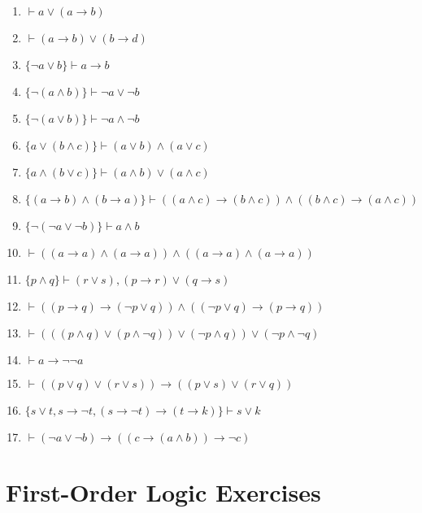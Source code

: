 \begin{enumerate}
    \item \(\vdash a \lor (a \to b)\)
    \item \(\vdash (a \to b) \lor (b \to d)\)
    \item \(\{\lnot a \lor b\} \vdash a \to b\)
    \item \(\{\lnot(a \land b)\} \vdash \lnot a \lor \lnot b\)
    \item \(\{\lnot(a \lor b)\} \vdash \lnot a \land \lnot b\)
    \item \(\{a \lor (b \land c)\} \vdash (a \lor b) \land (a \lor c)\)
    \item \(\{a \land (b \lor c)\} \vdash (a \land b) \lor (a \land c)\)
    \item \(\{(a \to b) \land (b \to a)\} \vdash ((a \land c) \to (b \land c)) \land ((b \land c) \to (a \land c))\)
    \item \(\{\lnot(\lnot a \lor \lnot b)\} \vdash a \land b\)
    \item \(\vdash ((a \to a) \land (a \to a)) \land ((a \to a) \land (a \to a))\)
    \item \(\{p \land q\} \vdash (r \lor s), (p \to r) \lor (q \to s)\)
    \item \(\vdash ((p \to q) \to (\lnot p \lor q)) \land ((\lnot p \lor q) \to (p \to q))\)
    \item \(\vdash (((p \land q) \lor (p \land \lnot q)) \lor (\lnot p \land q)) \lor (\lnot p \land \lnot q)\)
    \item \(\vdash a \to \lnot \lnot a\)
    \item \(\vdash ((p \lor q) \lor (r \lor s)) \to ((p \lor s) \lor (r \lor q))\)
    \item \(\{s \lor t, s \to \lnot t, (s \to \lnot t) \to (t \to k)\} \vdash s \lor k\)
    \item \(\vdash (\lnot a \lor \lnot b) \to ((c \to (a \land b)) \to \lnot c)\)
\end{enumerate}

\section{First-Order Logic Exercises}

